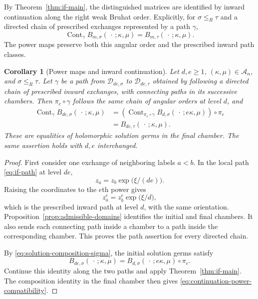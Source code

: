 \documentclass[12pt]{amsart}
\newtheorem{cor}[thm]{Corollary}
\theoremstyle{definition}
\numberwithin{equation}{section}
\theoremstyle{definition}
\let\mc\mathcal
\let\gm\gamma
\let\ka\kappa
\let\si\sigma
\let\ge\geqslant
\let\le\leqslant
\def\beq{\begin{equation}}
\def\eeq{\end{equation}}
\begin{document}
By Theorem~\ref{thm:if-main}, the distinguished matrices are
identified by inward continuation along the right weak Bruhat
order. Explicitly, for $\si\le_R\tau$ and a directed chain of
prescribed exchanges represented by a path $\gm$,
\beq\label{eq:functorial-weak-continuation}
 \operatorname{Cont}_{\gm}B_{m,\si}(\,\cdot\,;\ka,\mu)
 =B_{m,\tau}(\,\cdot\,;\ka,\mu).
\eeq
The power maps preserve both this angular order and the
prescribed inward path classes.

\begin{cor}[Power maps and inward continuation]
\label{cor:continuation-power-compatibility}
Let $d,e\ge1$, $(\ka,\mu)\in\mc A_n$, and $\si\le_R\tau$.
Let $\gm$ be a path from $\mc D_{de,\si}$ to
$\mc D_{de,\tau}$ obtained by following a directed chain of
prescribed inward exchanges, with connecting paths in its
successive chambers. Then $\pi_e\circ\gm$ follows the same
chain of angular orders at level $d$, and
\beq\label{eq:continuation-power-compatibility}
 \begin{aligned}
 \operatorname{Cont}_{\gm}B_{de,\si}(\,\cdot\,;\ka,\mu)
 &=\left(
   \operatorname{Cont}_{\pi_e\circ\gm}
      B_{d,\si}(\,\cdot\,;e\ka,\mu)
   \right)\circ\pi_e\\
 &=B_{de,\tau}(\,\cdot\,;\ka,\mu).
 \end{aligned}
\eeq
These are equalities of holomorphic solution germs in the final
chamber. The same assertion holds with $d,e$ interchanged.
\end{cor}

\begin{proof}
First consider one exchange of neighboring labels $a<b$.
In the local path \eqref{eq:if-path} at level $de$,
\[
 z_a=z_b\exp\bigl(\xi/(de)\bigr).
\]
Raising the coordinates to the $e$th power gives
\[
 z_a^e=z_b^e\exp\bigl(\xi/d\bigr),
\]
which is the prescribed inward path at level $d$, with the
same orientation. Proposition~\ref{prop:admissible-domains}
identifies the initial and final chambers. It also sends each
connecting path inside a chamber to a path inside the
corresponding chamber. This proves the path assertion for
every directed chain.

By \eqref{eq:solution-composition-sigma}, the initial solution
germs satisfy
\[
 B_{de,\si}(\,\cdot\,;\ka,\mu)
 =B_{d,\si}(\,\cdot\,;e\ka,\mu)\circ\pi_e.
\]
Continue this identity along the two paths and apply
Theorem~\ref{thm:if-main}. The composition identity in the
final chamber then gives
\eqref{eq:continuation-power-compatibility}.
\end{proof}
\end{document}

